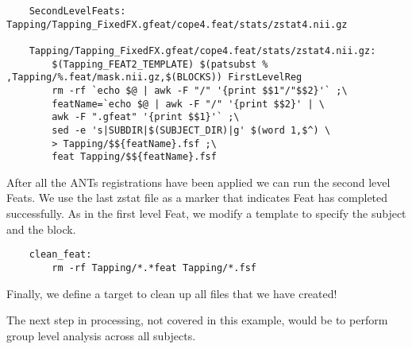 \begin{lstlisting}
	SecondLevelFeats: Tapping/Tapping_FixedFX.gfeat/cope4.feat/stats/zstat4.nii.gz

	Tapping/Tapping_FixedFX.gfeat/cope4.feat/stats/zstat4.nii.gz:
        $(Tapping_FEAT2_TEMPLATE) $(patsubst % ,Tapping/%.feat/mask.nii.gz,$(BLOCKS)) FirstLevelReg
		rm -rf `echo $@ | awk -F "/" '{print $$1"/"$$2}'` ;\
		featName=`echo $@ | awk -F "/" '{print $$2}' | \
		awk -F ".gfeat" '{print $$1}'` ;\
		sed -e 's|SUBDIR|$(SUBJECT_DIR)|g' $(word 1,$^) \
		> Tapping/$${featName}.fsf ;\
		feat Tapping/$${featName}.fsf
\end{lstlisting}
After all the ANTs registrations have been applied we can run the
second level Feats. We use the last zstat file as a marker that
indicates Feat has completed successfully. As in the first level Feat, we modify a template
to specify the subject and the block.

\begin{lstlisting}
	clean_feat:
		rm -rf Tapping/*.*feat Tapping/*.fsf
\end{lstlisting}

Finally, we define a target to clean up all files that we have
created! 

The next step in processing, not covered in this example, would be to
perform group level analysis across all subjects.